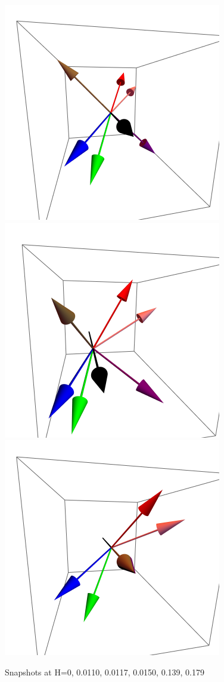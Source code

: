 \documentclass{article}
\begin{document}
\begin{figure}[ht]
\includegraphics[scale=0.22]{HVariedData/Pictures/010Inc151.png}
\includegraphics[scale=0.22]{HVariedData/Pictures/010Inc32S.png}
\includegraphics[scale=0.22]{HVariedData/Pictures/010Inc33S.png}
\caption{Snapshots at H=0, 0.0110, 0.0117, 0.0150, 0.139, 0.179 }
\end{figure}
\end{document}
